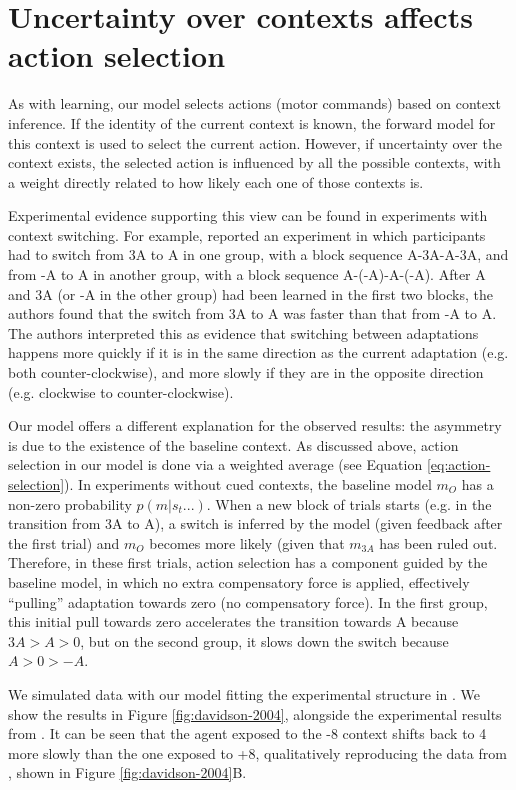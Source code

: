 \documentclass[a4paper,doc,floatsintext,natbib]{apa6}
\def \fref #1{Figure \ref{#1}}     %
\def \eref #1{Equation \ref{#1}}   %
\begin{document}
\section{Uncertainty over contexts affects action selection}
As with learning, our model selects actions (motor commands) based on context inference. If the identity of the current context is known, the forward model for this context is used to select the current action. However, if uncertainty over the context exists, the selected action is influenced by all the possible contexts, with a weight directly related to how likely each one of those contexts is.

Experimental evidence supporting this view can be found in experiments with context switching. For example, \cite{Davidson_Scaling_2004} reported an experiment in which participants had to switch from 3A to A in one group, with a block sequence A-3A-A-3A, and from -A to A in another group, with a block sequence A-(-A)-A-(-A). After A and 3A (or -A in the other group) had been learned in the first two blocks, the authors found that the switch from 3A to A was faster than that from -A to A. The authors interpreted this as evidence that switching between adaptations happens more quickly if it is in the same direction as the current adaptation (e.g. both counter-clockwise), and more slowly if they are in the opposite direction (e.g. clockwise to counter-clockwise).

Our model offers a different explanation for the observed results: the asymmetry is due to the existence of the baseline context. As discussed above, action selection in our model is done via a weighted average (see \eref{eq:action-selection}). In experiments without cued contexts, the baseline model $m_O$ has a non-zero probability $p(m | s_t ...)$. When a new block of trials starts (e.g. in the transition from 3A to A), a switch is inferred by the model (given feedback after the first trial) and $m_O$ becomes more likely (given that $m_{3A}$ has been ruled out. Therefore, in these first trials, action selection has a component guided by the baseline model, in which no extra compensatory force is applied, effectively ``pulling'' adaptation towards zero (no compensatory force). In the first group, this initial pull towards zero accelerates the transition towards A because $3A > A > 0$, but on the second group, it slows down the switch because $A > 0 > -A$.

We simulated data with our model fitting the experimental structure in \cite{Davidson_Scaling_2004}. We show the results in \fref{fig:davidson-2004}, alongside the experimental results from \cite{Davidson_Scaling_2004}. It can be seen that the agent exposed to the -8 context shifts back to 4 more slowly than the one exposed to +8, qualitatively reproducing the data from \cite{Davidson_Scaling_2004}, shown in \fref{fig:davidson-2004}B.
\end{document}
